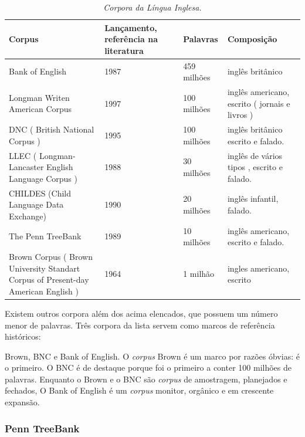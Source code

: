 \begin{table}
   \centering
   \small
   \caption{\it Corpora da Língua Inglesa.}

   \begin{tabular}{ | p{5cm} | p{3cm} | p{3cm} | p{3cm} | }
      \hline
        \textbf{Corpus} & \textbf{Lançamento, referência na literatura} & \textbf{Palavras}& \textbf{Composição}\\
        \hline
        \hline
        Bank of English & 1987 \footnotemark[1] & 459 milhões & inglês britânico\\
        \hline
        Longman Writen American Corpus & 1997 & 100 milhões  & inglês americano, escrito ( jornais e livros )\\
        \hline
        DNC ( British National Corpus ) & 1995 & 100 milhões  & inglês britânico escrito e falado.\\
        \hline
        LLEC ( Longman-Lancaster English Language Corpus ) & 1988 & 30 milhões  & inglês de vários tipos , escrito e falado.\\
        \hline
        CHILDES (Child Language Data Exchange) & 1990 & 20 milhões & inglês infantil, falado.\\
        \hline
        The Penn TreeBank & 1989 & 10 milhões & inglês americano, escrito e falado.\\
        \hline
        Brown Corpus ( Brown University Standart Corpus of Present-day American English ) & 1964 & 1 milhão  & ingles americano, escrito\\
        \hline
   \end{tabular}
   \label{tbl:corpora}
\end{table}

Existem outros corpora além dos acima elencados, que possuem um número menor de palavras. Três corpora da lista servem como marcos de referência históricos:

Brown, BNC e Bank of English. O \emph{corpus} Brown é um marco por razões óbvias: é o primeiro. O BNC é de destaque porque foi o primeiro a conter 100 milhões de palavras. Enquanto o Brown e o BNC são \emph{corpus} de amostragem, planejados e fechados, O Bank of English é um \emph{corpus} monitor, orgânico e em crescente expansão.


\subsubsection{Penn TreeBank}
\label{sub:corpus_ingles_esquema_pen}

